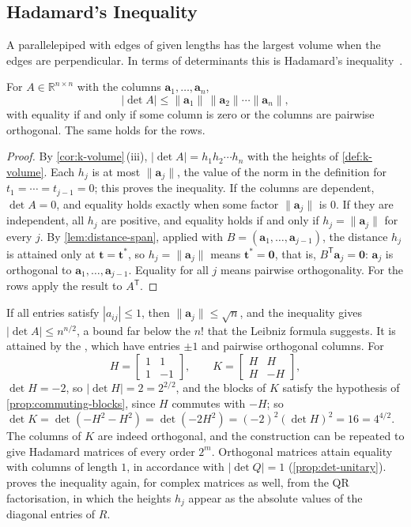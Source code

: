 \subsection{Hadamard's Inequality}

A parallelepiped with edges of given lengths has the largest volume when the edges are perpendicular. In terms of determinants this is Hadamard's inequality~\cite{hadamard1893}.

\begin{theorem}
\label{thm:hadamard}
For $A\in\mathbb R^{n\times n}$ with the columns $\mathbf a_1,\ldots,\mathbf a_n$,
\[
|\det A|\le\|\mathbf a_1\|\,\|\mathbf a_2\|\cdots\|\mathbf a_n\| ,
\]
with equality if and only if some column is zero or the columns are pairwise orthogonal. The same holds for the rows.
\end{theorem}

\begin{proof}
By \cref{cor:k-volume}\,(iii), $|\det A|=h_1h_2\cdots h_n$ with the heights of \cref{def:k-volume}. Each $h_j$ is at most $\|\mathbf a_j\|$, the value of the norm in the definition for $t_1=\cdots=t_{j-1}=0$; this proves the inequality. If the columns are dependent, $\det A=0$, and equality holds exactly when some factor $\|\mathbf a_j\|$ is $0$. If they are independent, all $h_j$ are positive, and equality holds if and only if $h_j=\|\mathbf a_j\|$ for every $j$. By \cref{lem:distance-span}, applied with $B=(\mathbf a_1,\ldots,\mathbf a_{j-1})$, the distance $h_j$ is attained only at $\mathbf t=\mathbf t^*$, so $h_j=\|\mathbf a_j\|$ means $\mathbf t^*=\mathbf 0$, that is, $B^{\mathsf T}\mathbf a_j=\mathbf 0$: $\mathbf a_j$ is orthogonal to $\mathbf a_1,\ldots,\mathbf a_{j-1}$. Equality for all $j$ means pairwise orthogonality. For the rows apply the result to $A^{\mathsf T}$.
\end{proof}

If all entries satisfy $|a_{ij}|\le1$, then $\|\mathbf a_j\|\le\sqrt n$, and the inequality gives $|\det A|\le n^{n/2}$, a bound far below the $n!$ that the Leibniz formula suggests. It is attained by the , which have entries $\pm1$ and pairwise orthogonal columns. For
\[
H=\begin{bmatrix}1&1\\1&-1\end{bmatrix},\qquad K=\begin{bmatrix}H&H\\H&-H\end{bmatrix},
\]
$\det H=-2$, so $|\det H|=2=2^{2/2}$, and the blocks of $K$ satisfy the hypothesis of \cref{prop:commuting-blocks}, since $H$ commutes with $-H$; so $\det K=\det(-H^2-H^2)=\det(-2H^2)=(-2)^2(\det H)^2=16=4^{4/2}$. The columns of $K$ are indeed orthogonal, and the construction can be repeated to give Hadamard matrices of every order $2^m$. Orthogonal matrices attain equality with columns of length $1$, in accordance with $|\det Q|=1$ (\cref{prop:det-unitary}).  proves the inequality again, for complex matrices as well, from the QR factorisation, in which the heights $h_j$ appear as the absolute values of the diagonal entries of $R$.

